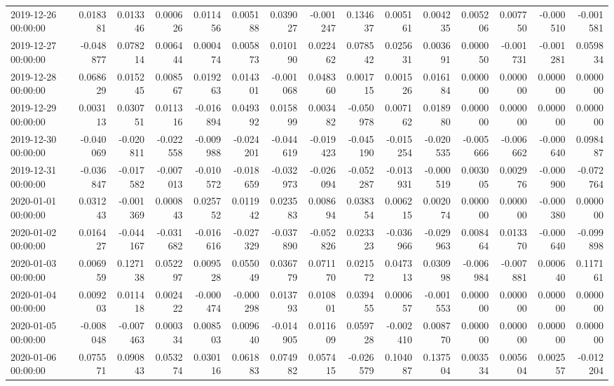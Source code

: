 \begin{tabular}{lrrrrrrrrrrrrrr}
2019-12-26 00:00:00 & 0.018381 & 0.013346 & 0.000626 & 0.011456 & 0.005188 & 0.039027 & -0.001247 & 0.134637 & 0.005161 & 0.004235 & 0.005206 & 0.007750 & -0.000510 & -0.001581 \\
2019-12-27 00:00:00 & -0.048877 & 0.078214 & 0.006444 & 0.000474 & 0.005873 & 0.010190 & 0.022462 & 0.078542 & 0.025631 & 0.003691 & 0.000050 & -0.001731 & -0.001281 & 0.059834 \\
2019-12-28 00:00:00 & 0.068629 & 0.015245 & 0.008567 & 0.019263 & 0.014301 & -0.001068 & 0.048360 & 0.001715 & 0.001526 & 0.016184 & 0.000000 & 0.000000 & 0.000000 & 0.000000 \\
2019-12-29 00:00:00 & 0.003113 & 0.030751 & 0.011316 & -0.016894 & 0.049392 & 0.015899 & 0.003482 & -0.050978 & 0.007162 & 0.018980 & 0.000000 & 0.000000 & 0.000000 & 0.000000 \\
2019-12-30 00:00:00 & -0.040069 & -0.020811 & -0.022558 & -0.009988 & -0.024201 & -0.044619 & -0.019423 & -0.045190 & -0.015254 & -0.020535 & -0.005666 & -0.006662 & -0.000640 & 0.098487 \\
2019-12-31 00:00:00 & -0.036847 & -0.017582 & -0.007013 & -0.010572 & -0.018659 & -0.032973 & -0.026094 & -0.052287 & -0.013931 & -0.000519 & 0.003005 & 0.002976 & -0.000900 & -0.072764 \\
2020-01-01 00:00:00 & 0.031243 & -0.001369 & 0.000843 & 0.025752 & 0.011942 & 0.023583 & 0.008694 & 0.038354 & 0.006215 & 0.002074 & 0.000000 & 0.000000 & -0.000380 & 0.000000 \\
2020-01-02 00:00:00 & 0.016427 & -0.044167 & -0.031682 & -0.016616 & -0.027329 & -0.037890 & -0.052826 & 0.023323 & -0.036966 & -0.029963 & 0.008464 & 0.013370 & -0.000640 & -0.099898 \\
2020-01-03 00:00:00 & 0.006959 & 0.127138 & 0.052297 & 0.009528 & 0.055049 & 0.036779 & 0.071170 & 0.021572 & 0.047313 & 0.030998 & -0.006984 & -0.007881 & 0.000640 & 0.117161 \\
2020-01-04 00:00:00 & 0.009203 & 0.011418 & 0.002422 & -0.000474 & -0.000298 & 0.013793 & 0.010801 & 0.039455 & 0.000657 & -0.001553 & 0.000000 & 0.000000 & 0.000000 & 0.000000 \\
2020-01-05 00:00:00 & -0.008048 & -0.007463 & 0.000334 & 0.008503 & 0.009640 & -0.014905 & 0.011609 & 0.059728 & -0.002410 & 0.008770 & 0.000000 & 0.000000 & 0.000000 & 0.000000 \\
2020-01-06 00:00:00 & 0.075571 & 0.090843 & 0.053274 & 0.030116 & 0.061883 & 0.074982 & 0.057415 & -0.026579 & 0.104087 & 0.137504 & 0.003534 & 0.005604 & 0.002557 & -0.012204 \\

\end{tabular}
